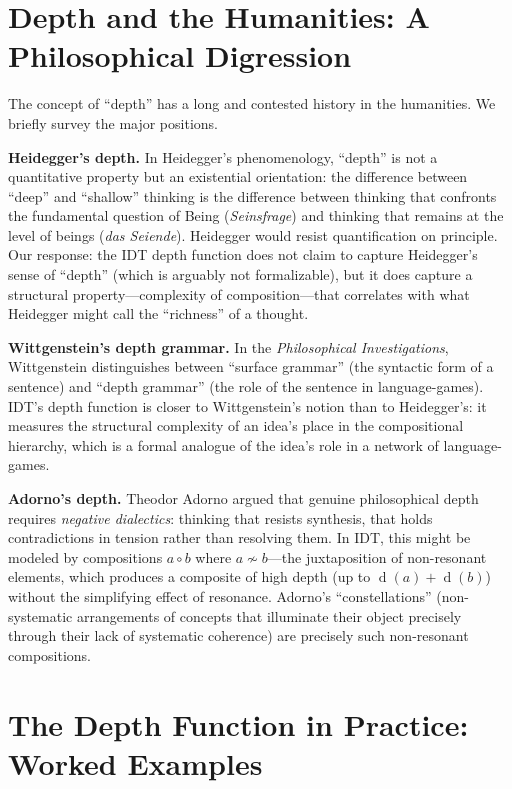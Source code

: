 \documentclass[11pt,openany]{book}
\theoremstyle{definition}
\theoremstyle{plain}
\theoremstyle{remark}
\newcommand{\compose}{\circ}                 %
\newcommand{\res}{\sim}                      %
\newcommand{\depth}{\operatorname{d}}       %
\begin{document}
\section{Depth and the Humanities: A Philosophical Digression}

The concept of ``depth'' has a long and contested history in the humanities. We briefly survey the major positions.

\textbf{Heidegger's depth.} In Heidegger's phenomenology, ``depth'' is not a quantitative property but an existential orientation: the difference between ``deep'' and ``shallow'' thinking is the difference between thinking that confronts the fundamental question of Being (\textit{Seinsfrage}) and thinking that remains at the level of beings (\textit{das Seiende}). Heidegger would resist quantification on principle. Our response: the IDT depth function does not claim to capture Heidegger's sense of ``depth'' (which is arguably not formalizable), but it does capture a structural property---complexity of composition---that correlates with what Heidegger might call the ``richness'' of a thought.

\textbf{Wittgenstein's depth grammar.} In the \textit{Philosophical Investigations}, Wittgenstein distinguishes between ``surface grammar'' (the syntactic form of a sentence) and ``depth grammar'' (the role of the sentence in language-games). IDT's depth function is closer to Wittgenstein's notion than to Heidegger's: it measures the structural complexity of an idea's place in the compositional hierarchy, which is a formal analogue of the idea's role in a network of language-games.

\textbf{Adorno's depth.} Theodor Adorno argued that genuine philosophical depth requires \emph{negative dialectics}: thinking that resists synthesis, that holds contradictions in tension rather than resolving them. In IDT, this might be modeled by compositions $a \compose b$ where $a \not\res b$---the juxtaposition of non-resonant elements, which produces a composite of high depth (up to $\depth(a) + \depth(b)$) without the simplifying effect of resonance. Adorno's ``constellations'' (non-systematic arrangements of concepts that illuminate their object precisely through their lack of systematic coherence) are precisely such non-resonant compositions.

\section{The Depth Function in Practice: Worked Examples}
\end{document}
